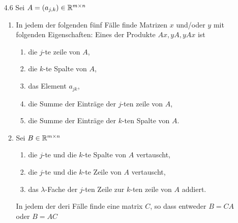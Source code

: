 \documentclass{HM}
\begin{document}
\begin{enumerate}
\begin{enumerate}
\end{enumerate}
\item [4.6] Sei $A=(a_{j,k})\in\mathbb{R}^{m\times n}$
\begin{enumerate}
\item In jedem der folgenden fünf Fälle finde Matrizen $x$ und/oder $y$ mit folgenden Eigenschaften: Eines der Produkte $Ax, yA, yAx$ ist
\begin{enumerate}
\item die $j$-te zeile von $A$,
\item die $k$-te Spalte von $A$,
\item das Element $a_{jk}$,
\item die Summe der Einträge der $j$-ten zeile von $A$,
\item die Summe der Einträge der $k$-ten Spalte von $A$.
\end{enumerate}
\item Sei $B\in\mathbb{R}^{m\times n}$
\begin{enumerate}
\item die $j$-te und die $k$-te Spalte von $A$ vertauscht,
\item die $j$-te und die $k$-te Zeile von $A$ vertauscht,
\item das $\lambda$-Fache der $j$-ten Zeile zur $k$-ten zeile von $A$ addiert.
\end{enumerate}
In jedem der deri Fälle finde eine matrix $C$, so dass entweder $B=CA$ oder $B=AC$
\end{enumerate}
\end{enumerate}
\end{document}
